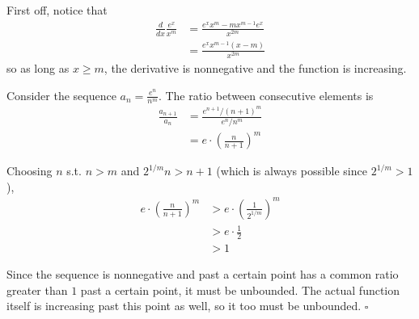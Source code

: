 \documentclass[12pt]{article}
\begin{document}
First off, notice that
\begin{align*}
    \frac{d}{dx} \frac{e^x}{x^m}
     & = \frac{e^x x^m - mx^{m-1}e^x}{x^{2m}}         \\
     & = \frac{e^x x^{m-1}\left(x - m\right)}{x^{2m}}
\end{align*}
so as long as $x \ge m$, the derivative is nonnegative and the function is increasing.

Consider the sequence $a_n=\frac{e^n}{n^m}$.
The ratio between consecutive elements is
\begin{align*}
    \frac{a_{n+1}}{a_n}
     & = \frac{e^{n+1} / (n+1)^m}{e^n / n^m}  \\
     & = e \cdot \left(\frac{n}{n+1}\right)^m
\end{align*}

Choosing $n$ s.t. $n > m$ and $2^{1/m}n > n+1$
(which is always possible since $2^{1/m} > 1$),
\begin{align*}
    e \cdot \left(\frac{n}{n+1}\right)^m
     & > e \cdot \left(\frac{1}{2^{1/m}}\right)^m \\
     & > e \cdot \frac{1}{2}                      \\
     & > 1
\end{align*}

Since the sequence is nonnegative and past a certain point
has a common ratio greater than $1$ past a certain point, it must be unbounded.
The actual function itself is increasing past this point as well,
so it too must be unbounded. $\square$
\end{document}
